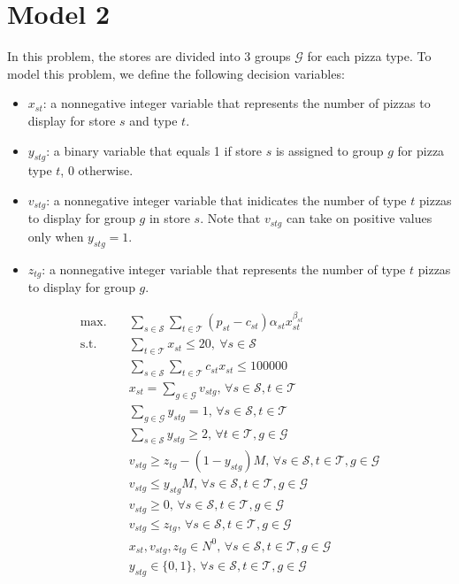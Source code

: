 \documentclass[a4, 11pt]{article}
\begin{document}
\section{Model 2}
In this problem, the stores are divided into 3 groups $\mathcal{G}$ for each pizza type.
To model this problem, we define the following decision variables:

\begin{itemize}
	\item $x_{st}$: a nonnegative integer variable that represents the number of pizzas to display for store $s$ and type $t$.
	\item $y_{stg}$: a binary variable that equals 1 if store $s$ is assigned to group $g$ for pizza type $t$, 0 otherwise.
	\item $v_{stg}$: a nonnegative integer variable that inidicates the number of type $t$ pizzas to display for group $g$ in store $s$. Note that $v_{stg}$ can take on positive values only when $y_{stg} = 1$.
	\item $z_{tg}$: a nonnegative integer variable that represents the number of type $t$ pizzas to display for group $g$.
\end{itemize}

\begin{align}
	\text{max.} &\quad \sum_{s \in \mathcal{S}} \sum_{t \in \mathcal{T}} (p_{st} - c_{st}) \alpha_{st} x_{st}^{\beta_{st}} \label{m2-obj} \\
	\text{s.t.} &\quad  \sum_{t \in \mathcal{T}} x_{st} \leq 20, \ \forall s \in \mathcal{S} \label{m2-cons1} \\
	&\quad \sum_{s \in \mathcal{S}} \sum_{t \in \mathcal{T}} c_{st} x_{st} \leq 100000 \label{m2-cons2} \\
	&\quad x_{st} = \sum_{g \in \mathcal{G}} v_{stg}, \, \forall s \in \mathcal{S}, t \in \mathcal{T} \label{m2-cons3} \\
	&\quad \sum_{g \in \mathcal{G}} y_{stg} = 1, \, \forall s \in \mathcal{S}, t \in \mathcal{T} \label{m2-cons4} \\
	&\quad \sum_{s \in \mathcal{S}} y_{stg} \geq 2, \, \forall t \in \mathcal{T}, g \in \mathcal{G} \label{m2-cons5} \\
	&\quad v_{stg} \geq z_{tg} - (1 - y_{stg}) M, \, \forall s \in \mathcal{S}, t \in \mathcal{T}, g \in \mathcal{G} \label{m2-cons6} \\
	&\quad v_{stg} \leq y_{stg} M, \, \forall s \in \mathcal{S}, t \in \mathcal{T}, g \in \mathcal{G} \label{m2-cons7}  \\
	&\quad v_{stg} \geq 0, \, \forall s \in \mathcal{S}, t \in \mathcal{T}, g \in \mathcal{G} \label{m2-cons8} \\
	&\quad v_{stg} \leq z_{tg}, \, \forall s \in \mathcal{S}, t \in \mathcal{T}, g \in \mathcal{G} \label{m2-cons9} \\
	&\quad x_{st}, v_{stg}, z_{tg} \in N^0, \, \forall s \in \mathcal{S}, t \in \mathcal{T}, g \in \mathcal{G} \label{m2-cons10} \\
	&\quad y_{stg} \in \{0, 1\}, \, \forall s \in \mathcal{S}, t \in \mathcal{T}, g \in \mathcal{G} \label{m2-cons11}
\end{align}
\end{document}
